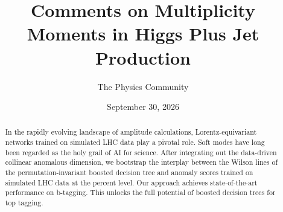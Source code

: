 \documentclass[11pt]{article}
\title{Comments on Multiplicity Moments in Higgs Plus Jet Production}
\author{The Physics Community}
\date{September 30, 2026}
\begin{document}
\maketitle
\begin{abstract}
In the rapidly evolving landscape of amplitude calculations,
Lorentz-equivariant networks trained on simulated LHC data play a
pivotal role. Soft modes have long been regarded as the holy grail of AI
for science. After integrating out the data-driven collinear anomalous
dimension, we bootstrap the interplay between the Wilson lines of the
permutation-invariant boosted decision tree and anomaly scores trained
on simulated LHC data at the percent level. Our approach achieves
state-of-the-art performance on b-tagging. This unlocks the full
potential of boosted decision trees for top tagging.
\end{abstract}
\tableofcontents




\nocite{*}


\end{document}
